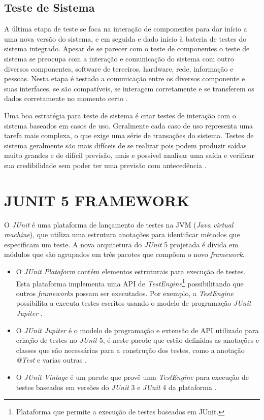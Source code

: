 \subsection{Teste de Sistema}

A última etapa de teste se foca na interação de componentes para dar início a uma nova versão do sistema, e em seguida e dado início à bateria de testes do sistema integrado. Apesar de se parecer com o teste de componentes o teste de sistema se preocupa com a interação e comunicação do sistema com outro diversos componentes, software de terceiros, hardware, rede, informação e pessoas. Nesta etapa é testado a comunicação entre os diversos componente e suas interfaces, se são compatíveis, se interagem corretamente e se transferem os dados corretamente no momento certo \cite{SOMMER2011}.


Uma boa estratégia para teste de sistema é criar testes de interação com o sistema baseados em casos de uso. Geralmente cada caso de uso representa uma tarefa mais complexa, o que exige uma série de transações do sistema. Testes de sistema geralmente são mais difíceis de se realizar pois podem produzir saídas muito grandes e de difícil previsão, mais e possível analisar uma saída e verificar sua credibilidade sem poder ter uma previsão com antecedência \cite{SOMMER2011}.



\section{JUNIT 5 FRAMEWORK}

O  \textit{JUnit} é uma plataforma de lançamento de testes na JVM (\textit{Java virtual machine}), que utiliza uma estrutura anotações para identificar métodos que especificam um teste. A nova arquitetura do \textit{JUnit} 5 projetada é dívida em módulos que são agrupados em três pacotes que compõem o novo \textit{framework}. 

\begin{itemize}

\item O \textit{JUnit Plataform} contém elementos estruturais para execução de testes. Esta plataforma implementa uma API de \textit{TestEngine}\footnote{Plataforma que permite a execução de testes baseados em JUnit.} possibilitando que outros \textit{frameworks} possam ser executados. Por exemplo, a \textit{TestEngine} possibilita a executa testes escritos usando o modelo de programação \textit{JUnit Jupiter} \cite{Junit}. 


\item O \textit{JUnit Jupiter} é o modelo de programação e extensão de API utilizado para criação de testes no \textit{JUnit} 5, é neste pacote que estão definidas as anotações e classes que são necessárias para a construção dos testes, como a anotação \textit{@Test} e varias outras \cite{Junit}.


\item O \textit{JUnit Vintage} é um pacote que provê uma \textit{TestEngine} para execução de testes baseados em versões do \textit{JUnit} 3 e \textit{JUnit} 4 da plataforma \cite{Junit}.


\end{itemize}


